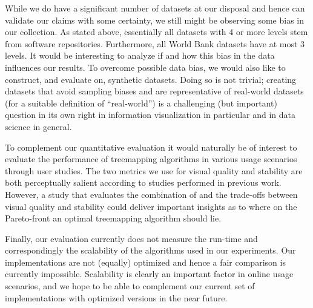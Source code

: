 While we do have a significant number of datasets at our disposal and hence can validate our claims with some certainty, we still might be observing some bias in our collection. As stated above, essentially all datasets with 4 or more levels stem from software repositories. Furthermore, all World Bank datasets have at most 3 levels. It would be interesting to analyze if and how this bias in the data influences our results.
To overcome possible data bias, we would also like to construct, and evaluate on, synthetic datasets. Doing so is not trivial; creating datasets that avoid sampling biases and are representative of real-world datasets (for a suitable definition of ``real-world'') is a challenging (but important) question in its own right in information visualization in particular and in data science in general.

To complement our quantitative evaluation it would naturally be of interest to evaluate the performance of treemapping algorithms in various usage scenarios through user studies. The two metrics we use for visual quality and stability are both perceptually salient according to studies performed in previous work. However, a study that evaluates the combination of and the trade-offs between visual quality and stability could deliver important insights as to where on the Pareto-front an optimal treemapping algorithm should lie.

Finally, our evaluation currently does not measure the run-time and correspondingly the scalability of the algorithms used in our experiments. Our implementations are not (equally) optimized and hence a fair comparison is currently impossible. Scalability is clearly an important factor in online usage scenarios, and we hope to be able to complement our current set of implementations with optimized versions in the near future.

\newpage
